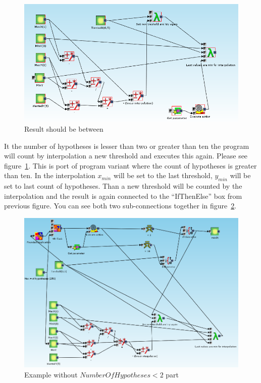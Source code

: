 \documentclass[a4paper,12pt]{book}
\begin{document}
\begin{figure}
	\includegraphics[width=1\textwidth]{exampleMainRecursionPart}
	\caption{Result should be between}
	\label{fig:resultBetween}
\end{figure}

It the number of hypotheses is lesser than two or greater than ten the program will count by interpolation a new threshold and executes this again. Please see figure~\ref{fig:resultBetween}. This is port of program variant where the count of hypotheses is greater than ten. In the interpolation $x_{min}$ will be set to the last threshold, $y_{min}$ will be set to last count of hypotheses. Than a new threshold will be counted by the interpolation and the result is again connected to the ``IfThenElse'' box from previous figure. You can see both two sub-connections together in figure~\ref{fig:exampleWithoutInterpolationOnMax}.

\begin{figure}
	\includegraphics[width=1\textwidth]{exampleWithoutInterpolationOnMax}
	\caption{Example without $NumberOfHypotheses < 2$ part}
	\label{fig:exampleWithoutInterpolationOnMax}
\end{figure}
\end{document}
